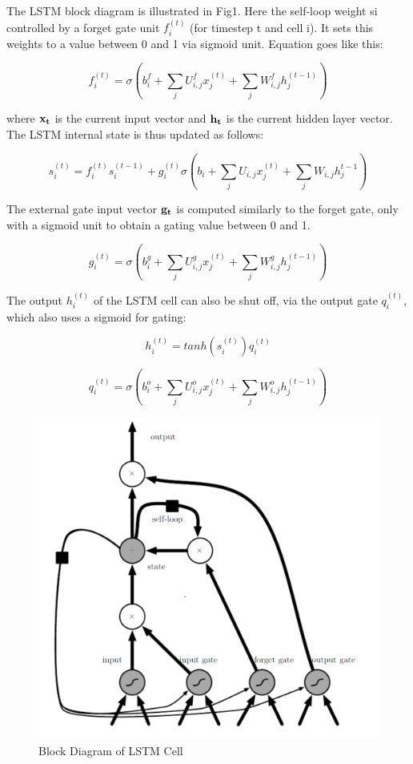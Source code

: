 \documentclass[10pt,a4paper]{article}
\begin{document}
\begin{spacing}{1.5}
The LSTM block diagram is illustrated in Fig1. Here the self-loop weight si controlled by a forget gate unit $f_i^{(t)}$ (for timestep t and cell i). It sets this weights to a value between 0 and 1 via sigmoid unit. Equation goes like this:

\begin{equation}
f_i^{(t)} = \sigma (b_i^f + \sum_j U_{i,j}^f x_j^{(t)} + \sum_j W_{i,j}^f h_j^{(t-1)})
\end{equation}

where $\bf{x}_t$ is the current input vector and $\bf{h}_t$ is the current hidden layer vector. The LSTM internal state is thus updated as follows:

\begin{equation}
s_i^{(t)} = f_i^{(t)} s_i^{(t-1)}+ g_i^{(t)} \sigma ( b_i + \sum_j U_{i,j}x_j^{(t)}+ \sum_j W_{i,j} h_j^{t-1})
\end{equation}

The external gate input vector $\bf{g}_t$ is computed similarly to the forget gate, only with a sigmoid unit to obtain a gating value between 0 and 1.

\begin{equation}
g_i^{(t)} = \sigma (b_i^g + \sum_j U_{i,j}^g x_j^{(t)} + \sum_j W_{i,j}^g h_j ^{(t-1)})
\end{equation}

The output $h_i^{(t)}$ of the LSTM cell can also be shut off, via the output gate $q_i^{(t)}$, which also uses a sigmoid for gating:

\begin{equation}
h_i^{(t)} = tanh(s_i^{(t)})q_i^{(t)}
\end{equation}

\begin{equation}
q_i^{(t)} = \sigma (b_i^o + \sum_j U_{i,j}^o x_j^{(t)}+ \sum_j W_{i,j}^o h_j^{(t-1)})
\end{equation}

\begin{figure}[H]
	\centering
	\includegraphics[width = 10 cm]{pic/1.png}
	\caption{Block Diagram of LSTM Cell}
\end{figure}


\end{spacing}
\end{document}
